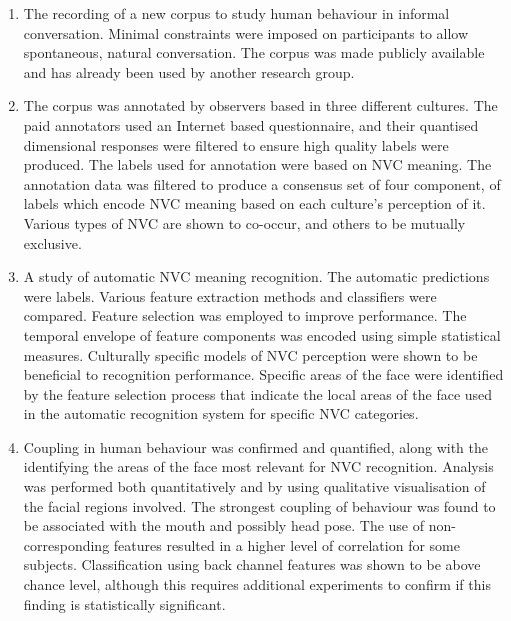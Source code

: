 \begin{enumerate}
 \item The recording of a new corpus to study human behaviour in informal conversation. Minimal constraints were imposed on participants to allow spontaneous, natural conversation. The corpus was made publicly available and has already been used by another research group. 
 \item The corpus was annotated by observers based in three different cultures. The paid annotators used an Internet based questionnaire, and their quantised dimensional responses were filtered to ensure high quality labels were produced. The labels used for annotation were based on \ac{NVC} meaning. The annotation data was filtered to produce a consensus set of four component, \continuous of labels which encode \ac{NVC} meaning based on each culture's perception of it. Various types of \ac{NVC} are shown to co-occur, and others to be mutually exclusive. 
 \item A study of automatic \ac{NVC} meaning recognition. The automatic predictions were \continuous labels. Various feature extraction methods and classifiers were compared. Feature selection was employed to improve performance. The temporal envelope of feature components was encoded using simple statistical measures. Culturally specific models of \ac{NVC} perception were shown to be beneficial to recognition performance. Specific areas of the face were identified by the feature selection process that indicate the local areas of the face used in the automatic recognition system for specific \ac{NVC} categories.
 \item Coupling in human behaviour was confirmed and quantified, along with the identifying the areas of the face most relevant for \ac{NVC} recognition. Analysis was performed both quantitatively and by using qualitative visualisation of the facial regions involved. The strongest coupling of behaviour was found to be associated with the mouth and possibly head pose. The use of non-corresponding features resulted in a higher level of correlation for some subjects. Classification using back channel features was shown to be above chance level, although this requires additional experiments to confirm if this finding is statistically significant.
\end{enumerate}


